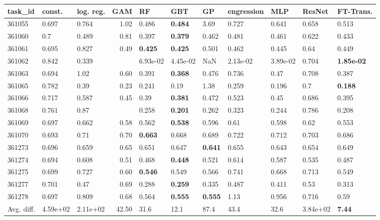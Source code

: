 \begin{table}[ht!]
\centering
\begingroup\footnotesize
\begin{tabular}{lllrlllllll}
  \hline
\hline
task\_id & const. & log. reg. & GAM & RF & GBT & GP & engression & MLP & ResNet & FT-Trans. \\ 
  \hline
361055 & 0.697 & 0.764 & 1.02 & 0.486 & \textbf{0.484} & 3.69 & 0.727 & 0.641 & 0.658 & 0.513 \\ 
  361060 & 0.7 & 0.489 & 0.81 & 0.397 & \textbf{0.379} & 0.462 & 0.481 & 0.461 & 0.622 & 0.433 \\ 
  361061 & 0.695 & 0.827 & 0.49 & \textbf{0.425} & \textbf{0.425} & 0.501 & 0.462 & 0.445 & 0.64 & 0.449 \\ 
  361062 & 0.842 & 0.339 &  & 6.93e-02 & 4.45e-02 & NaN & 2.13e-02 & 3.89e-02 & 0.704 & \textbf{1.85e-02} \\ 
  361063 & 0.694 & 1.02 & 0.60 & 0.391 & \textbf{0.368} & 0.476 & 0.736 & 0.47 & 0.708 & 0.387 \\ 
  361065 & 0.782 & 0.39 & 0.23 & 0.241 & 0.19 & 1.38 & 0.259 & 0.196 & 0.7 & \textbf{0.188} \\ 
  361066 & 0.717 & 0.587 & 0.45 & 0.39 & \textbf{0.381} & 0.472 & 0.523 & 0.45 & 0.686 & 0.395 \\ 
  361068 & 0.761 & 0.87 &  & 0.258 & \textbf{0.201} & 0.262 & 0.323 & 0.244 & 0.786 & 0.208 \\ 
  361069 & 0.697 & 0.662 & 0.58 & 0.562 & \textbf{0.538} & 0.596 & 0.61 & 0.598 & 0.62 & 0.553 \\ 
  361070 & 0.693 & 0.71 & 0.70 & \textbf{0.663} & 0.668 & 0.689 & 0.722 & 0.712 & 0.703 & 0.686 \\ 
  361273 & 0.696 & 0.659 & 0.65 & 0.651 & 0.647 & \textbf{0.641} & 0.655 & 0.643 & 0.654 & 0.649 \\ 
  361274 & 0.694 & 0.608 & 0.51 & 0.468 & \textbf{0.448} & 0.521 & 0.614 & 0.587 & 0.535 & 0.487 \\ 
  361275 & 0.699 & 0.727 & 0.60 & \textbf{0.546} & 0.549 & 0.566 & 0.741 & 0.668 & 0.713 & 0.549 \\ 
  361277 & 0.701 & 0.47 & 0.69 & 0.288 & \textbf{0.259} & 0.335 & 0.487 & 0.411 & 0.53 & 0.313 \\ 
  361278 & 0.697 & 0.809 & 0.68 & 0.564 & \textbf{0.555} & \textbf{0.555} & 1.13 & 0.956 & 0.716 & 0.59 \\ 
   \hline
Avg. diff. & 4.59e+02 & 2.11e+02 & 42.50 & 31.6 & 12.1 & 87.4 & 43.4 & 32.6 & 3.84e+02 & \textbf{7.44} \\ 

\end{tabular}
\end{table}

